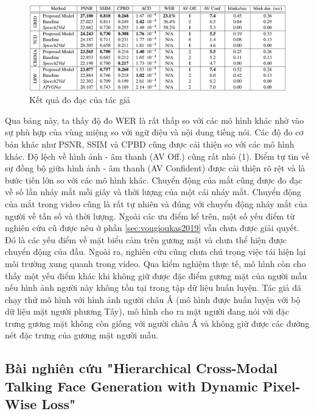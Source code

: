 \begin{figure}[H]
    \centering
    \includegraphics[width=15cm]{./content/images/vou2020_result.png}
    \caption{Kết quả đo đạc của tác giả}
    \label{fig:vou2020_result}
\end{figure}

Qua bảng này, ta thấy độ đo WER là rất thấp so với các mô hình khác nhờ vào sự phù hợp của vùng miệng so với ngữ điệu và nội dung tiếng nói. Các độ đo cơ bản khác như PSNR, SSIM và CPBD cũng được cải thiện so với các mô hình khác. Độ lệch về hình ảnh - âm thanh (AV Off.) cũng rất nhỏ (1). Điểm tự tin về sự đồng bộ giữa hình ảnh - âm thanh (AV Confident) được cải thiện rõ rệt và là bước tiến lớn so với các mô hình khác. Chuyển động của mắt cũng được đo đạc về số lần nháy mắt mỗi giây và thời lượng của một cái nháy mắt. Chuyển động của mắt trong video cũng là rất tự nhiên và đúng với chuyển động nháy mắt của người về tần số và thời lượng.
Ngoài các ưu điểm kể trên, một số yếu điểm từ nghiên cứu cũ được nêu ở phần \ref{sec:vougioukas2019} vẫn chưa được giải quyết. Đó là các yếu điểm về mặt biểu cảm trên gương mặt và chưa thể hiện được chuyển động của đầu. Ngoài ra, nghiên cứu cũng chưa chú trọng việc tái hiện lại môi trường xung quanh trong video. Qua kiểm nghiệm thực tế, mô hình còn cho thấy một yếu điểm khác khi không giữ được đặc điểm gương mặt của người mẫu nếu hình ảnh người này không tồn tại trong tập dữ liệu huấn luyện. Tác giả đã chạy thử mô hình với hình ảnh người châu Á (mô hình được huấn luyện với bộ dữ liệu mặt người phương Tây), mô hình cho ra mặt người đang nói với đặc trưng gương mặt không còn giống với người châu Á và không giữ được các đường nét đặc trưng của gương mặt người mẫu.


\subsection{\texorpdfstring{Bài nghiên cứu "Hierarchical Cross-Modal Talking Face Generation with Dynamic Pixel-Wise Loss"\cite{chen2019}}{Target}}

